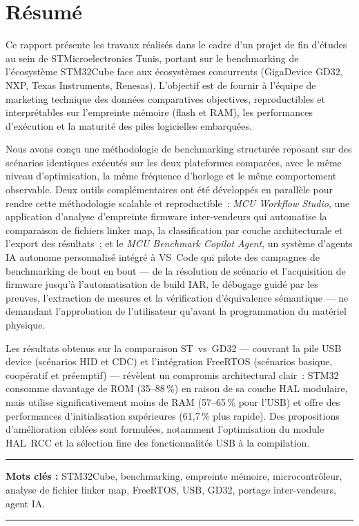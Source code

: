 \chapter*{Résumé}


Ce rapport présente les travaux réalisés dans le cadre d'un projet de fin d'études au sein de STMicroelectronics Tunis, portant sur le benchmarking de l'écosystème STM32Cube face aux écosystèmes concurrents (GigaDevice GD32, NXP, Texas Instruments, Renesas). L'objectif est de fournir à l'équipe de marketing technique des données comparatives objectives, reproductibles et interprétables sur l'empreinte mémoire (flash et RAM), les performances d'exécution et la maturité des piles logicielles embarquées.

Nous avons conçu une méthodologie de benchmarking structurée reposant sur des scénarios identiques exécutés sur les deux plateformes comparées, avec le même niveau d'optimisation, la même fréquence d'horloge et le même comportement observable. Deux outils complémentaires ont été développés en parallèle pour rendre cette méthodologie scalable et reproductible~: \emph{MCU Workflow Studio}, une application d'analyse d'empreinte firmware inter-vendeurs qui automatise la comparaison de fichiers linker map, la classification par couche architecturale et l'export des résultats~; et le \emph{MCU Benchmark Copilot Agent}, un système d'agents IA autonome personnalisé intégré à VS~Code qui pilote des campagnes de benchmarking de bout en bout --- de la résolution de scénario et l'acquisition de firmware jusqu'à l'automatisation de build IAR, le débogage guidé par les preuves, l'extraction de mesures et la vérification d'équivalence sémantique --- ne demandant l'approbation de l'utilisateur qu'avant la programmation du matériel physique.

Les résultats obtenus sur la comparaison ST~vs~GD32 --- couvrant la pile USB device (scénarios HID et CDC) et l'intégration FreeRTOS (scénarios basique, coopératif et préemptif) --- révèlent un compromis architectural clair~: STM32 consomme davantage de ROM (35--88\,\%) en raison de sa couche HAL modulaire, mais utilise significativement moins de RAM (57--65\,\% pour l'USB) et offre des performances d'initialisation supérieures (61,7\,\% plus rapide). Des propositions d'amélioration ciblées sont formulées, notamment l'optimisation du module HAL~RCC et la sélection fine des fonctionnalités USB à la compilation.

\noindent\rule[2pt]{\textwidth}{0.5pt}

{\textbf{Mots clés :}}
STM32Cube, benchmarking, empreinte mémoire, microcontrôleur, analyse de fichier linker map, FreeRTOS, USB, GD32, portage inter-vendeurs, agent IA.
\\
\noindent\rule[2pt]{\textwidth}{0.5pt}